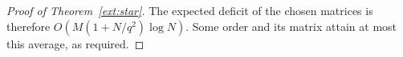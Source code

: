 \begin{proof}[Proof of Theorem~\ref{ext:star}]
The expected deficit of the chosen matrices is therefore
$O(M(1+N/q^2)\log N)$. Some order and its matrix attain at most
this average, as required.
\end{proof}

